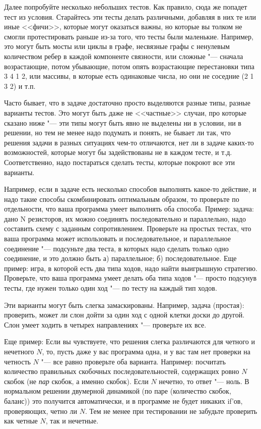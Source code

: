 \documentclass[a4paper,10pt]{problems}
\begin{document}
Далее попробуйте несколько небольших тестов. Как правило, сюда же попадет тест из условия. 
Старайтесь эти тесты делать различными, добавляя в них те или иные <<фичи>>, которые могут оказаться важны, 
но которые вы толком не смогли протестировать раньше из-за того, что тесты были маленькие. 
Например, это могут быть мосты или циклы в графе, несвязные графы с ненулевым количеством ребер в каждой компоненте связности, 
или сложные "--- сначала возрастающие, потом убывающие, потом опять возрастающие перестановки типа 3 4 1 2, или массивы, в которые есть одинаковые числа, 
но они не соседние (2 1 3 2) и т.п.

Часто бывает, что в задаче достаточно просто выделяются разные типы, разные варианты тестов. 
Это могут быть даже не <<частные>> случаи, про которые сказано ниже "--- эти типы могут быть явно не выделены
ни в условии, ни в решении, но тем не менее надо подумать и понять, не бывает ли так, что решения задачи в разных ситуациях
чем-то отличаются, нет ли в задаче каких-то возможностей, которые могут бы задействованы не в каждом тесте, и т.д.
Соответственно, надо постараться сделать тесты, которые покроют все эти варианты.

Например, если в задаче есть несколько способов выполнять какое-то действие, и надо такие способы скомбинировать оптимальным образом,
то проверьте по отдельности, что ваша программа умеет выполнять оба способа. 
Пример: задача: дано N резисторов, их можно соединять последовательно и параллельно, надо составить схему с заданным сопротивлением.
Проверьте на простых тестах, что ваша программа может использовать и последовательное, и параллельное соединение "---
подсуньте два теста, в которых надо сделать только одно соединение, и это должно быть а) параллельное; б) последовательное.
Еще пример: игра, в которой есть два типа ходов, надо найти выигрышную стратегию. Проверьте, что ваша программа умеет делать оба типа ходов
"--- просто подсунув тесты, где нужен только один ход "--- по тесту на каждый тип ходов.

Эти варианты могут быть слегка замаскированы. 
Например, задача (простая): проверить, может ли слон дойти за один ход с одной клетки доски до другой.
Слон умеет ходить в четырех направлениях "--- проверьте их все.

Еще пример: Если вы чувствуете, что решения слегка различаются для четного и нечетного $N$, то, пусть даже у вас программа одна,
и у вас там нет проверки на четность $N$ "--- все равно проверьте оба варианта. 
Например: посчитать количество правильных скобочных последовательностей, содержащих ровно $N$ скобок (не \textit{пар} скобок, а именно скобок).
Если $N$ нечетно, то ответ "--- ноль. 
В нормальном решении двумерной динамикой (по паре (количество скобок, баланс)) это получится автоматически, и в программе не будет никаких if'ов,
проверяющих, четно ли $N$. Тем не менее при тестировании не забудьте проверить как четные $N$, так и нечетные.
\end{document}
